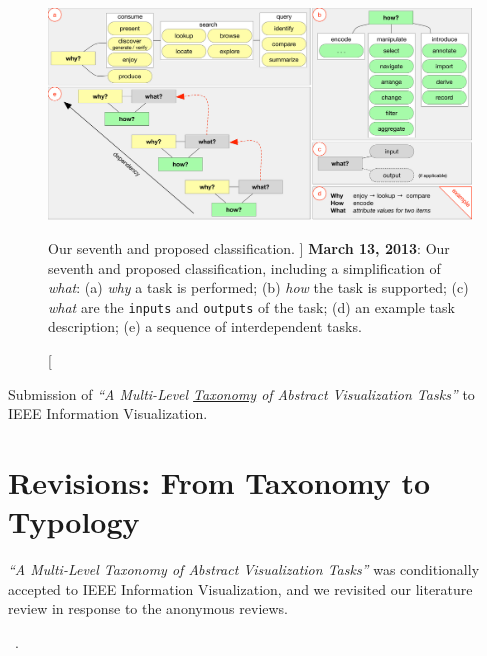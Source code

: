 
\begin{figure}
	\centering
	\includegraphics[width=\textwidth]{figures/typology-13-03-13.pdf}
	\caption
	[
	    Our seventh and proposed classification.
	]
	{
	    {\bf March 13, 2013}: Our seventh and proposed classification, including a simplification of \textsl{what}: (a) \textsl{why} a task is performed; (b) \textsl{how} the task is supported; (c) \textsl{what} are the {\tt inputs} and {\tt outputs} of the task; (d) an example task description; (e) a sequence of interdependent tasks.
	}
	\centering
	\label{app:typology:fig:13.03.13}
\end{figure}


Submission of {\it``A Multi-Level \underline{Taxonomy} of Abstract Visualization Tasks''} to IEEE Information Visualization.


\section{Revisions: From Taxonomy to Typology}
\label{app:typology:chronology:taxonomy}


{\it``A Multi-Level Taxonomy of Abstract Visualization Tasks''} was conditionally accepted to IEEE Information Visualization, and we revisited our literature review in response to the anonymous reviews.

\begin{sloppypar}
~\cite{Aigner2011}. \end{sloppypar}

